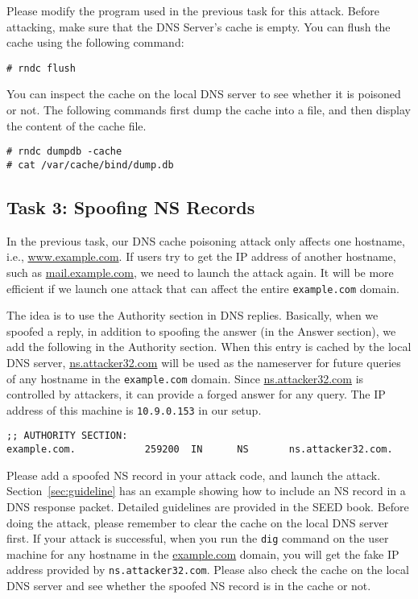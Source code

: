 Please modify the program used in the previous task for this attack. 
Before attacking, 
make sure that the DNS Server's cache is empty. 
You can flush the cache using the following command:

\begin{lstlisting}
# rndc flush
\end{lstlisting}

You can inspect the cache on the local DNS server to
see whether it is poisoned or not. The following commands
first dump the cache into a file, and then
display the content of the cache file. 

\begin{lstlisting}
# rndc dumpdb -cache
# cat /var/cache/bind/dump.db
\end{lstlisting}



\subsection{Task 3: Spoofing NS Records}

In the previous task, our DNS cache poisoning attack only affects 
one hostname, i.e., \url{www.example.com}. If users try to get the IP
address of another hostname, such as \url{mail.example.com}, we 
need to launch the attack again. It will be more efficient if we launch one
attack that can affect the entire \texttt{example.com} domain.  

The idea is to use the Authority section in DNS replies. 
Basically, when we spoofed a reply, in addition to spoofing the answer (in
the Answer section), we add the following in the Authority section.
When this entry is cached by the local DNS server, \url{ns.attacker32.com}
will be used as the nameserver for future queries of 
any hostname in the \texttt{example.com} domain.  Since 
\url{ns.attacker32.com} is controlled by attackers, it can
provide a forged answer for any query. The IP address 
of this machine is \texttt{10.9.0.153} in our setup. 

\begin{lstlisting}
;; AUTHORITY SECTION:
example.com.            259200  IN      NS       ns.attacker32.com.
\end{lstlisting}
 

Please add a spoofed NS record in your attack code, and launch the 
attack. Section~\ref{sec:guideline} has an example showing how to
include an NS record in a DNS response packet. 
Detailed guidelines are provided in the SEED book.
Before doing the attack, please remember to clear the cache on 
the local DNS server first.
If your attack is successful, when you run the \texttt{dig} command 
on the user machine for any hostname in the \url{example.com} domain, you will
get the fake IP address provided by \texttt{ns.attacker32.com}. Please also
check the cache on the local DNS server and see whether the spoofed 
NS record is in the cache or not.



